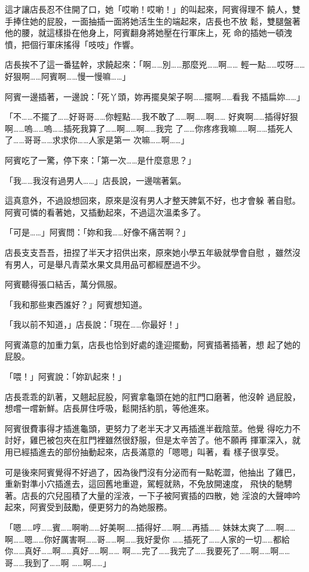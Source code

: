 這才讓店長忍不住開了口，她「哎喲！哎喲！」的叫起來，阿賓得理不
饒人，雙手捧住她的屁股，一面抽插一面將她活生生的端起來，店長也不放
鬆，雙腿盤著他的腰，就這樣掛在他身上，阿賓翻身將她壓在行軍床上，死
命的插她一頓洩憤，把個行軍床搖得「吱吱」作響。

店長挨不了這一番猛幹，求饒起來：「啊……別……那麼兇……啊……
輕一點……哎呀……好狠啊……阿賓啊……慢一慢嘛……」

阿賓一邊插著，一邊說：「死丫頭，妳再擺臭架子啊……擺啊……看我
不插扁妳……」

「不……不擺了……好哥哥……你輕點……我不敢了……啊……啊……
好爽啊……插得好狠啊……嗚……嗚……插死我算了……啊……啊……我完
了……你疼疼我嘛……啊……插死人了……哥哥……求求你……人家是第一
次嘛……啊……」

阿賓吃了一驚，停下來：「第一次……是什麼意思？」

「我……我沒有過男人……」店長說，一邊喘著氣。

這真意外，不過設想回來，原來是沒有男人才整天脾氣不好，也才會躲
著自慰。阿賓可憐的看著她，又插動起來，不過這次溫柔多了。

「可是……」阿賓問：「妳和我……好像不痛苦啊？」

店長支支吾吾，扭捏了半天才招供出來，原來她小學五年級就學會自慰
，雖然沒有男人，可是舉凡青菜水果文具用品可都經歷過不少。

阿賓聽得張口結舌，萬分佩服。

「我和那些東西誰好？」阿賓想知道。

「我以前不知道，」店長說：「現在……你最好！」

阿賓滿意的加重力氣，店長也恰到好處的逢迎擺動，阿賓插著插著，想
起了她的屁股。

「喂！」阿賓說：「妳趴起來！」

店長乖乖的趴著，又翹起屁股，阿賓拿龜頭在她的肛門口磨著，他沒幹
過屁股，想嚐一嚐新鮮。店長屏住呼吸，鬆開括約肌，等他進來。

阿賓很費事得才插進龜頭，更努力了老半天才又再插進半截陰莖。他覺
得吃力不討好，雞巴被包夾在肛門裡雖然很舒服，但是太辛苦了。他不願再
揮軍深入，就用已經插進去的部份抽動起來，店長滿意的「嗯嗯」叫著，看
樣子很享受。

可是後來阿賓覺得不好過了，因為後門沒有分泌而有一點乾澀，他抽出
了雞巴，重新對準小穴插進去，這回舊地重遊，駕輕就熟，不免放開速度，
飛快的馳騁著。店長的穴兒囤積了大量的淫液，一下子被阿賓插的四散，她
淫浪的大聲呻吟起來，阿賓受到鼓勵，便更努力的為她服務。

「嗯……哼……賓……啊喲……好美啊……插得好……啊……再插……
妹妹太爽了……啊……啊……嗯……你好厲害啊……哥……啊……我好愛你
……插死了……人家的一切……都給你……真好……啊……真好……啊……
啊……完了……我完了……我要死了……啊……啊……哥……我到了……啊
……啊……」

